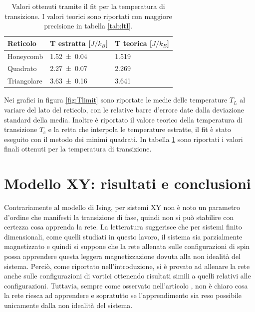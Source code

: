 \documentclass{article}
\begin{document}
\begin{table}[!ht]
\begin{center}
\begin{tabular}{lll}
\toprule
Reticolo & T estratta [$J/k_B$] & T teorica [$J/k_B$] \\
\midrule
Honeycomb & \num{1.52 \pm 0.04} & \num{1.519} \\
Quadrato & \num{2.27 \pm 0.07} & \num{2.269} \\
Triangolare & \num{3.63 \pm 0.16} & \num{3.641} \\
\bottomrule
\end{tabular}
\end{center}
\caption{Valori ottenuti tramite il fit per la temperatura di transizione. I valori teorici sono riportati con maggiore precisione in tabella \ref{tab:ltI}.}
\label{tab:Tising}
\end{table}

Nei grafici in figura \ref{fig:Tlimit} sono riportate le medie delle temperature $T_L$ al variare del lato del reticolo, con le relative barre d'errore date dalla deviazione standard della media.
Inoltre è riportato il valore teorico della temperatura di transizione $T_c$ e la retta che interpola le temperature estratte, il fit è stato eseguito con il metodo dei minimi quadrati.
In tabella \ref{tab:Tising} sono riportati i valori finali ottenuti per la temperatura di transizione.


\section{Modello XY: risultati e conclusioni}
Contrariamente al modello di Ising, per sistemi XY non è noto un parametro d'ordine che manifesti la transizione di fase, quindi non si può stabilire con certezza cosa apprenda la rete.
La letteratura \cite{melko} suggerisce che per sistemi finito dimensionali, come quelli studiati in questo lavoro, il sistema sia parzialmente magnetizzato e quindi si suppone che la rete allenata sulle configurazioni di spin possa apprendere questa leggera magnetizzazione dovuta alla non idealità del sistema.
Perciò, come riportato nell'introduzione, si è provato ad allenare la rete anche sulle configurazioni di vortici ottenendo risultati simili a quelli relativi alle configurazioni.
Tuttavia, sempre come osservato nell'articolo \cite{melko}, non è chiaro cosa la rete riesca ad apprendere e sopratutto se l'apprendimento sia reso possibile unicamente dalla non idealità del sistema.
\end{document}
